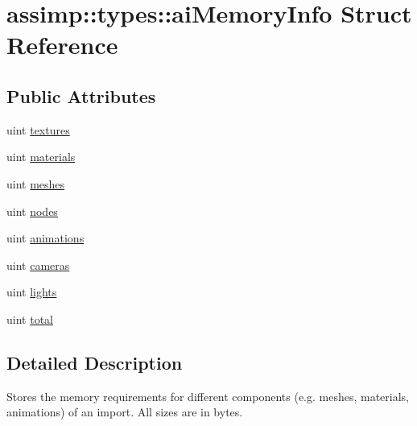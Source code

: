 \hypertarget{structassimp_1_1types_1_1ai_memory_info}{\section{assimp\+:\+:types\+:\+:ai\+Memory\+Info Struct Reference}
\label{structassimp_1_1types_1_1ai_memory_info}
}
\subsection*{Public Attributes}
\begin{DoxyCompactItemize}
\item 
uint \hyperlink{structassimp_1_1types_1_1ai_memory_info_a63f5b49b428fca3a5f92f58d0814f0bc}{textures}
\item 
uint \hyperlink{structassimp_1_1types_1_1ai_memory_info_a2025dc0a0c1164bd455e8464e0ba18bd}{materials}
\item 
uint \hyperlink{structassimp_1_1types_1_1ai_memory_info_a48f750621e7eba688fb3865838733fa6}{meshes}
\item 
uint \hyperlink{structassimp_1_1types_1_1ai_memory_info_a86112d8082eb8acafdbb45b768d56a0b}{nodes}
\item 
uint \hyperlink{structassimp_1_1types_1_1ai_memory_info_aee7913ca2406845fb1e38e4ae7c0c45a}{animations}
\item 
uint \hyperlink{structassimp_1_1types_1_1ai_memory_info_a71247c6f2abba98245066bb3147c5e0f}{cameras}
\item 
uint \hyperlink{structassimp_1_1types_1_1ai_memory_info_af3a707fc5e15341b8c9437a7e08ce587}{lights}
\item 
uint \hyperlink{structassimp_1_1types_1_1ai_memory_info_a5e65cad95960a53a4f960e87f0afd546}{total}
\end{DoxyCompactItemize}


\subsection{Detailed Description}
Stores the memory requirements for different components (e.\+g. meshes, materials, animations) of an import. All sizes are in bytes. 

